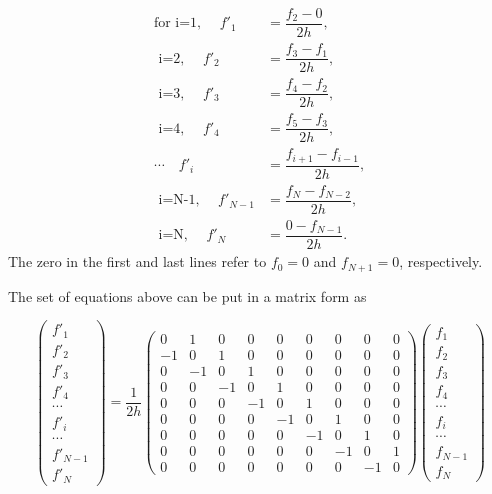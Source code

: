 \begin{align}
 \text{for i=1, }\quad f'_1 &= \dfrac{f_2-0}{2h},\\
 \text{    i=2, }\quad f'_2 &= \dfrac{f_3-f_1}{2h},\\
 \text{    i=3, }\quad f'_3 &= \dfrac{f_4-f_2}{2h},\\
 \text{    i=4, }\quad f'_4 &= \dfrac{f_5-f_3}{2h},\\
          \cdots \quad f'_i &= \dfrac{f_{i+1}-f_{i-1}}{2h},\\
 \text{  i=N-1, }\quad f'_{N-1} &= \dfrac{f_N-f_{N-2}}{2h},\\
 \text{  i=N,   }\quad f'_{N} &= \dfrac{0-f_{N-1}}{2h}.
\end{align}
The zero in the first and last lines refer to $f_0 = 0$ and $f_{N+1} = 0$, respectively.

The set of equations above can be put in a matrix form as

\begin{equation}
 \begin{pmatrix}
  f'_1 \\f'_2 \\ f'_3 \\ f'_4 \\ \cdots \\ f'_i \\ \cdots \\ f'_{N-1} \\ f'_N
 \end{pmatrix}
 = \dfrac{1}{2h}
\begin{pmatrix} 
 0 & 1 & 0 & 0 & 0 & 0 & 0 & 0 & 0\\
 -1 & 0 & 1 & 0 & 0 & 0 & 0 & 0 & 0\\
 0 & -1 & 0 & 1 & 0 & 0 & 0 & 0 & 0\\
 0 & 0 & -1 & 0 & 1 & 0 & 0 & 0 & 0\\
 0 & 0 & 0 & -1 & 0 & 1 & 0 & 0 & 0\\
 0 & 0 & 0 & 0 & -1 & 0 & 1 & 0 & 0\\
 0 & 0 & 0 & 0 & 0 & -1 & 0 & 1 & 0\\
 0 & 0 & 0 & 0 & 0 & 0 & -1 & 0 & 1\\
 0 & 0 & 0 & 0 & 0 & 0 & 0 & -1 & 0
\end{pmatrix}
\begin{pmatrix}
  f_1 \\f_2 \\ f_3 \\ f_4 \\ \cdots \\ f_i \\ \cdots \\ f_{N-1} \\ f_N
\end{pmatrix}
\end{equation}

